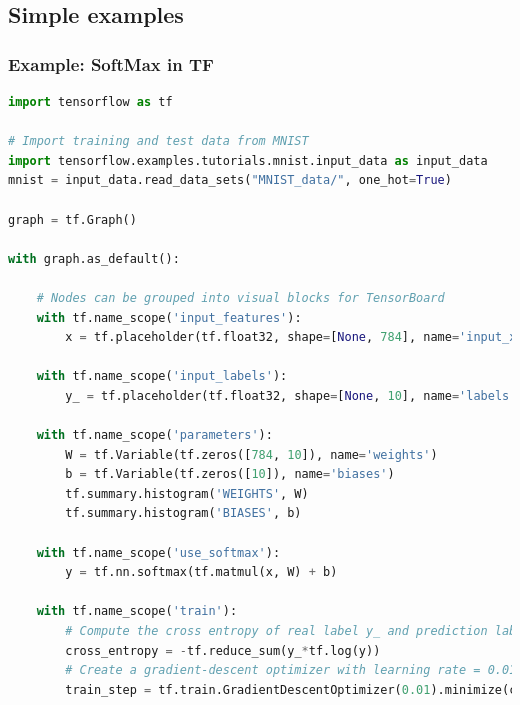\subsection{Simple examples}

\begin{frame}[fragile]
  \MyLogo
  \frametitle{Example: SoftMax in TF}  
 
\begin{lstlisting}[language=python]
import tensorflow as tf

# Import training and test data from MNIST
import tensorflow.examples.tutorials.mnist.input_data as input_data
mnist = input_data.read_data_sets("MNIST_data/", one_hot=True)

graph = tf.Graph()

with graph.as_default():

    # Nodes can be grouped into visual blocks for TensorBoard
    with tf.name_scope('input_features'):
        x = tf.placeholder(tf.float32, shape=[None, 784], name='input_x')

    with tf.name_scope('input_labels'):
        y_ = tf.placeholder(tf.float32, shape=[None, 10], name='labels')

    with tf.name_scope('parameters'):
        W = tf.Variable(tf.zeros([784, 10]), name='weights')
        b = tf.Variable(tf.zeros([10]), name='biases')
        tf.summary.histogram('WEIGHTS', W)
        tf.summary.histogram('BIASES', b)
    
    with tf.name_scope('use_softmax'):
        y = tf.nn.softmax(tf.matmul(x, W) + b)

    with tf.name_scope('train'):
        # Compute the cross entropy of real label y_ and prediction label y
        cross_entropy = -tf.reduce_sum(y_*tf.log(y))
        # Create a gradient-descent optimizer with learning rate = 0.01
        train_step = tf.train.GradientDescentOptimizer(0.01).minimize(cross_entropy)
\end{lstlisting}

\end{frame}

